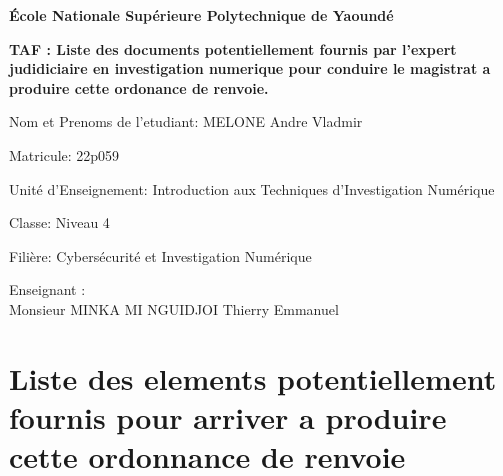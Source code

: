 \documentclass[12pt]{article}
\begin{document}
\begin{titlepage}
    \centering
    \vspace*{1cm}
    {\Huge\bfseries École Nationale Supérieure Polytechnique de Yaoundé \par}
    \vspace{1.5cm}
    {\Huge\bfseries TAF : Liste des documents potentiellement fournis par l'expert judidiciaire en investigation numerique pour conduire le magistrat a produire cette ordonance de renvoie. \par}
    \vspace{1.5cm}
    {\Large Nom et Prenoms de l'etudiant: MELONE Andre Vladmir \par}
    \vspace{0.5cm}
    {\large Matricule: 22p059 \par}
    \vspace{0.5cm}
    {\large Unité d'Enseignement: Introduction aux Techniques d'Investigation Numérique \par}
    \vspace{0.5cm}
    {\large Classe: Niveau 4 \par}
    \vspace{0.5cm}
    {\large Filière: Cybersécurité et Investigation Numérique \par}
    \vspace{2cm}
    {\large Enseignant : \\ Monsieur MINKA MI NGUIDJOI Thierry Emmanuel \par}
    \vspace{1cm}

\end{titlepage}


\newpage

\tableofcontents
\newpage

\section{Liste des elements potentiellement fournis pour arriver a produire cette ordonnance de renvoie}
\end{document}
